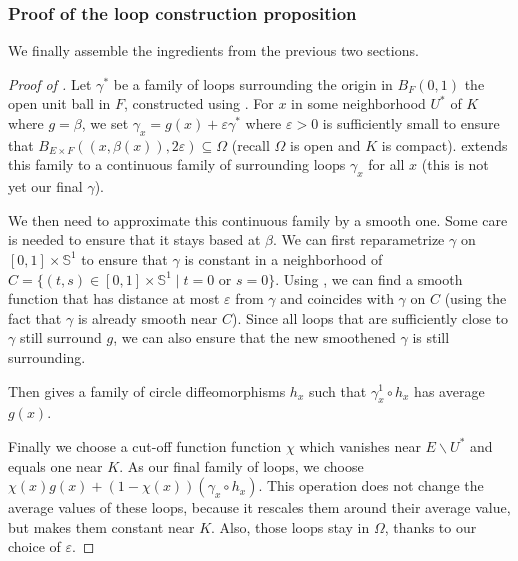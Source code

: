 \subsubsection*{Proof of the loop construction proposition}

We finally assemble the ingredients from the previous two sections.

\begin{proof}[Proof of ]
  \leanok
  Let $γ^*$ be a family of loops surrounding the origin in $B_F(0,1)$
  the open unit ball in $F$, constructed using .
  For $x$ in some neighborhood $U^*$ of $K$ where $g = β$, we set
  $γ_x = g(x) + εγ^*$ where $ε > 0$ is sufficiently small to ensure that
  $B_{E\times F}((x,β(x)),2ε)\subseteq \Omega$ (recall $Ω$ is
  open and $K$ is compact).
   extends this family to a continuous
  family of surrounding loops $γ_x$ for all $x$ (this is not yet our
  final $γ$).

  We then need to approximate this continuous family by a smooth one.
  Some care is needed to ensure that it stays based at $β$.
  We can first reparametrize $γ$ on $[0,1] \times 𝕊^1$
  to ensure that $γ$ is constant in a neighborhood of
  $C = \{(t, s) \in [0,1] \times 𝕊^1 \mid t = 0 \text{ or } s = 0\}$.
  Using , we can find a smooth function
  that has distance at most $ε$ from $γ$ and coincides with $γ$ on $C$
  (using the fact that $γ$ is already smooth near $C$).
  Since all loops that are sufficiently close to $γ$ still surround $g$,
  we can also ensure that the new smoothened $γ$ is still surrounding.

  Then  gives a family of circle
  diffeomorphisms $h_x$ such that $γ^1_x ∘ h_x$ has average $g(x)$.

  Finally we choose a cut-off function function $χ$ which vanishes near
  $E ∖ U^*$ and equals one near $K$. As our final family of loops,
  we choose $χ(x)g(x) + (1-χ(x))(γ_x ∘ h_x)$. This
  operation does not change the average values of these loops, because
  it rescales them around their average value, but makes them constant
  near $K$. Also, those loops stay in $Ω$, thanks to our choice of $ε$.
\end{proof}

